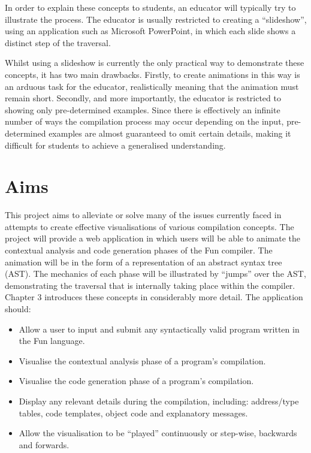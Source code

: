 \documentclass{l4proj}
\begin{document}
In order to explain these concepts to students, an educator will typically try to illustrate the process. The educator is usually restricted to creating a ``slideshow'', using an application such as Microsoft PowerPoint, in which each slide shows a distinct step of the traversal. 

Whilst using a slideshow is currently the only practical way to demonstrate these concepts, it has two main drawbacks. Firstly, to create animations in this way is an arduous task for the educator, realistically meaning that the animation must remain short. Secondly, and more importantly, the educator is restricted to showing only pre-determined examples. Since there is effectively an infinite number of ways the compilation process may occur depending on the input, pre-determined examples are almost guaranteed to omit certain details, making it difficult for students to achieve a generalised understanding.

\section{Aims}
This project aims to alleviate or solve many of the issues currently faced in attempts to create effective visualisations of various compilation concepts. The project will provide a web application in which users will be able to animate the contextual analysis and code generation phases of the Fun compiler. The animation will be in the form of a representation of an abstract syntax tree (AST). The mechanics of each phase will be illustrated by ``jumps'' over the AST, demonstrating the traversal that is internally taking place within the compiler. Chapter 3 introduces these concepts in considerably more detail. The application should:
\begin{itemize}
\item Allow a user to input and submit any syntactically valid program written in the Fun language.
\item Visualise the contextual analysis phase of a program's compilation. 
\item Visualise the code generation phase of a program's compilation.
\item Display any relevant details during the compilation, including: address/type tables, code templates, object code and explanatory messages.
\item Allow the visualisation to be ``played'' continuously or step-wise, backwards and forwards.
\end{itemize}
\end{document}
